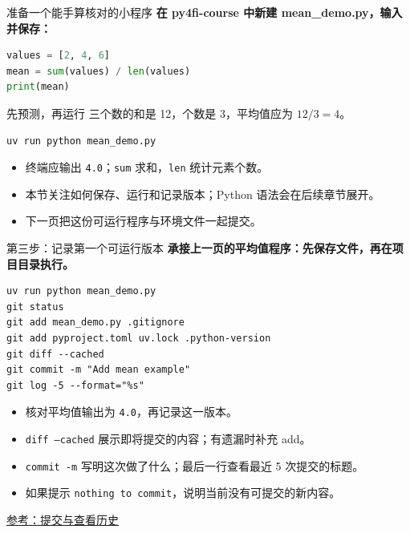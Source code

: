 \documentclass[9pt]{ctexbeamer}
\begin{document}
\begin{frame}[fragile]{准备一个能手算核对的小程序}
  \textbf{在 py4fi-course 中新建 mean\_demo.py，输入并保存：}
\begin{lstlisting}[language=Python,numbers=none]
values = [2, 4, 6]
mean = sum(values) / len(values)
print(mean)
\end{lstlisting}
  \begin{block}{先预测，再运行}
    三个数的和是 12，个数是 3，平均值应为 $12/3=4$。
  \end{block}
\begin{lstlisting}[language={},numbers=none]
uv run python mean_demo.py
\end{lstlisting}
  \begin{itemize}
    \item 终端应输出 \texttt{4.0}；\texttt{sum} 求和，\texttt{len} 统计元素个数。
    \item 本节关注如何保存、运行和记录版本；Python 语法会在后续章节展开。
    \item 下一页把这份可运行程序与环境文件一起提交。
  \end{itemize}
\end{frame}

\begin{frame}[fragile]{第三步：记录第一个可运行版本}
  \textbf{承接上一页的平均值程序：先保存文件，再在项目目录执行。}
\begin{lstlisting}[language={},numbers=none]
uv run python mean_demo.py
git status
git add mean_demo.py .gitignore
git add pyproject.toml uv.lock .python-version
git diff --cached
git commit -m "Add mean example"
git log -5 --format="%s"
\end{lstlisting}
  \begin{itemize}
    \item 核对平均值输出为 \texttt{4.0}，再记录这一版本。
    \item \texttt{diff --cached} 展示即将提交的内容；有遗漏时补充 add。
    \item \texttt{commit -m} 写明这次做了什么；最后一行查看最近 5 次提交的标题。
    \item 如果提示 \texttt{nothing to commit}，说明当前没有可提交的新内容。
  \end{itemize}
  {\tiny\href{https://git-scm.com/docs/gittutorial}{参考：提交与查看历史}}
\end{frame}
\end{document}
